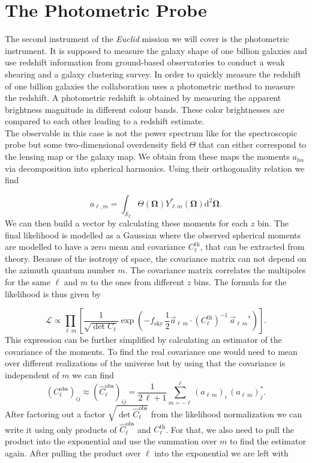 \documentclass[oneside]{book}
\newcommand*{\Euclid}{\textit{Euclid}\xspace}
\newcommand*{\rd}{\mathrm{d}}
\begin{document}
\chapter{The Photometric Probe}
The second instrument of the \Euclid mission we will cover is the photometric instrument. It is supposed to measure the galaxy shape of one billion galaxies and use redshift information from ground-based observatories to conduct a weak shearing and a galaxy clustering survey. In order to quickly measure the redshift of one billion galaxies the collaboration uses a photometric method to measure the redshift. A photometric redshift is obtained by measuring the apparent brightness magnitude in different colour bands. These color brightnesses are compared to each other leading to a redshift estimate.\\
The observable in this case is not the power spectrum like for the spectroscopic probe but some two-dimensional overdensity field $\varTheta$ that can either correspond to the lensing map or the galaxy map. We obtain from these maps the moments $a_{lm}$ via decomposition into spherical harmonics. Using their orthogonality relation we find 

\begin{equation}
    a_{\ell, m} = \int_{\mathcal{S}_2} \varTheta(\boldsymbol{\Omega}) Y_{\ell\,m}^*(\boldsymbol{\Omega}) \rd^2 \boldsymbol{\boldsymbol{\Omega}}.
\end{equation}
We can then build a vector by calculating these moments for each $z$ bin. The final likelihood is modelled as a Gaussian where the observed spherical moments are modelled to have a zero mean and covariance $C^\mathrm{th}_\ell$, that can be extracted from theory. Because of the isotropy of space, the covariance matrix can not depend on the azimuth quantum number $m$. The covariance matrix correlates the multipoles for the same $\ell$ and $m$ to the ones from different $z$ bins. The formula for the likelihood is thus given by 

\begin{equation}
    \mathcal{L} \propto \prod_{\ell\,m} \left[\frac{1}{\sqrt{\det C_\ell}} \exp\left(-f_\mathrm{sky}\, \frac{1}{2}\vec{a}_{\ell\,m} \cdot \left(C_\ell^\mathrm{th}\right)^{-1}\,\vec{a}_{\ell\,m}^{}\!^*\right) \right].
\end{equation}
This expression can be further simplified by calculating an estimator of the covariance of the moments. To find the real covariance one would need to mean over different realizations of the universe but by using that the covariance is independent of $m$ we can find \begin{equation}
    \left(C^\mathrm{obs}_\ell\right)_{ij} \approx  \left(\hat{C}^\mathrm{obs}_\ell\right)_{ij} = \frac{1}{2\,\ell+1} \sum_{m=-\ell}^{\ell} \left(a_{\ell\,m}\right)_i \, \left(a_{\ell\,m}\right)_j^*.
\end{equation}
After factoring out a factor $\sqrt{\det \hat{C}^\mathrm{obs}_\ell}$ from the likelihood normalization we can write it using only products of $\hat{C}_\ell^\mathrm{obs}$ and $C_\ell^\mathrm{th}$. For that, we also need to pull the product into the exponential and use the summation over $m$ to find the estimator again. After pulling the product over $\ell$ into the exponential we are left with 
\end{document}
